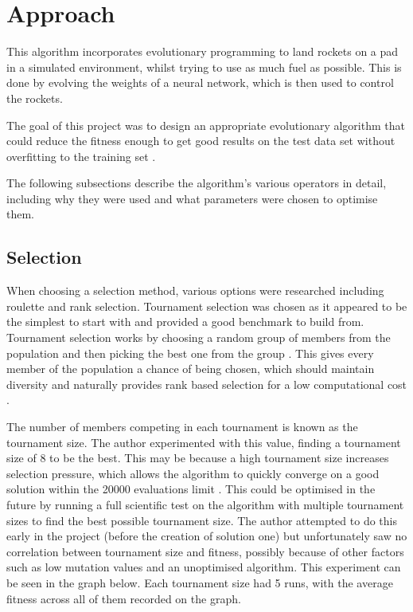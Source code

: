 \documentclass[sigconf]{acmart}
\begin{document}
\section{Approach}
This algorithm incorporates evolutionary programming to land rockets on a pad in a simulated environment, whilst trying to use as much fuel as possible. This is done by evolving the weights of a neural network, which is then used to control the rockets. 

The goal of this project was to design an appropriate evolutionary algorithm that could reduce the fitness enough to get good results on the test data set without overfitting to the training set \cite{overfitting}.

The following subsections describe the algorithm's various operators in detail, including why they were used and what parameters were chosen to optimise them.

\subsection{Selection}
When choosing a selection method, various options were researched including roulette and rank selection. Tournament selection was chosen as it appeared to be the simplest to start with and provided a good benchmark to build from. Tournament selection works by choosing a random group of members from the population and then picking the best one from the group \cite{tournament3}. This gives every member of the population a chance of being chosen, which should maintain diversity \cite{tournament} and naturally provides rank based selection for a low computational cost \cite{tournament2}.

The number of members competing in each tournament is known as the tournament size. The author experimented with this value, finding a tournament size of 8 to be the best. This may be because a high tournament size increases selection pressure, which allows the algorithm to quickly converge on a good solution within the 20000 evaluations limit \cite{selectionPressure}. This could be optimised in the future by running a full scientific test on the algorithm with multiple tournament sizes to find the best possible tournament size. The author attempted to do this early in the project (before the creation of solution one) but unfortunately saw no correlation between tournament size and fitness, possibly because of other factors such as low mutation values and an unoptimised algorithm. This experiment can be seen in the graph below. Each tournament size had 5 runs, with the average fitness across all of them recorded on the graph.
\end{document}
